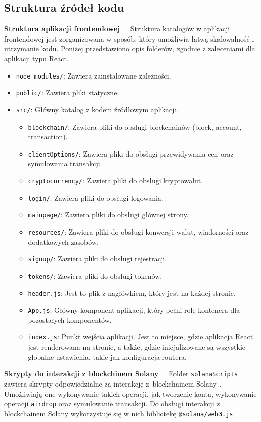 \subsection{Struktura źródeł kodu}
\noindent \textbf{Struktura aplikacji frontendowej~~}
Struktura katalogów w aplikacji frontendowej jest zorganizowana w sposób, który umożliwia łatwą skalowalność i utrzymanie kodu. Poniżej przedstawiono opis folderów, zgodnie z zaleceniami dla aplikacji typu React.
\begin{itemize}
    \item \texttt{node\_modules/}: Zawiera zainstalowane zależności.
    \item \texttt{public/}: Zawiera pliki statyczne.
    \item \texttt{src/}: Główny katalog z kodem źródłowym aplikacji.
    \begin{itemize}
        \item \texttt{blockchain/}: Zawiera pliki do obsługi blockchainów (block, account, transaction).
        \item \texttt{clientOptions/}: Zawiera pliki do obsługi przewidywania cen oraz symulowania transakcji.
        \item \texttt{cryptocurrency/}: Zawiera pliki do obsługi kryptowalut.
        \item \texttt{login/}: Zawiera pliki do obsługi logowania.
        \item \texttt{mainpage/}: Zawiera pliki do obsługi głównej strony.
        \item \texttt{resources/}: Zawiera pliki do obsługi konwersji walut, wiadomości oraz dodatkowych zasobów.
        \item \texttt{signup/}: Zawiera pliki do obsługi rejestracji.
        \item \texttt{tokens/}: Zawiera pliki do obsługi tokenów.
        \item \texttt{header.js}: Jest to plik z nagłówkiem, który jest na każdej stronie.
        \item \texttt{App.js}: Główny komponent aplikacji, który pełni rolę kontenera dla pozostałych komponentów.
        \item \texttt{index.js}: Punkt wejścia aplikacji. Jest to miejsce, gdzie aplikacja React jest renderowana na stronie, a także, gdzie inicjalizowane są wszystkie globalne ustawienia, takie jak konfiguracja routera.
    \end{itemize}
\end{itemize}

\noindent \textbf{Skrypty do interakcji z blockchinem Solany~~}
Folder \texttt{solanaScripts} zawiera skrypty odpowiedzialne za interakcję z~blockchainem Solany \cite{advanced_blockchain_development}. Umożliwiają one wykonywanie takich operacji, jak tworzenie konta, wykonywanie operacji \texttt{airdrop} oraz symulowanie transakcji. Do obsługi interakcji z blockchainem Solany wykorzystuje się w nich bibliotekę \texttt{@solana/web3.js}


